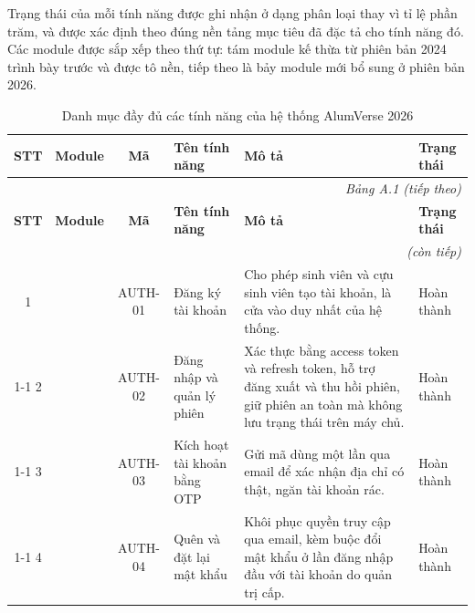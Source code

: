 \documentclass[12pt,a4paper,oneside]{report}
\begin{document}
Trạng thái của mỗi tính năng được ghi nhận ở dạng phân loại thay vì tỉ lệ phần trăm, và được xác định theo đúng nền tảng mục tiêu đã đặc tả cho tính năng đó. Các module được sắp xếp theo thứ tự: tám module kế thừa từ phiên bản 2024 trình bày trước và được tô nền, tiếp theo là bảy module mới bổ sung ở phiên bản 2026.

\renewcommand{\arraystretch}{1.3}
\footnotesize
\begin{longtable}{|c|>{\raggedright\arraybackslash}p{2.5cm}|c|>{\raggedright\arraybackslash}p{3.1cm}|>{\raggedright\arraybackslash}p{5.0cm}|>{\raggedright\arraybackslash}p{1.9cm}|}
\caption{Danh mục đầy đủ các tính năng của hệ thống AlumVerse 2026}\label{tab:appendixA}\\
\hline
\textbf{STT} & \textbf{Module} & \textbf{Mã} & \textbf{Tên tính năng} & \textbf{Mô tả} & \textbf{Trạng thái} \\ \hline
\endfirsthead
\multicolumn{6}{r}{\itshape\footnotesize Bảng A.1 (tiếp theo)}\\[2pt]
\hline
\textbf{STT} & \textbf{Module} & \textbf{Mã} & \textbf{Tên tính năng} & \textbf{Mô tả} & \textbf{Trạng thái} \\ \hline
\endhead
\hline \multicolumn{6}{r}{\itshape\footnotesize (còn tiếp)}\\
\endfoot
\hline
\endlastfoot
\cellcolor{oldrow}1 & \cellcolor{oldrow} & \cellcolor{oldrow}AUTH-01 & \cellcolor{oldrow}Đăng ký tài khoản & \cellcolor{oldrow}Cho phép sinh viên và cựu sinh viên tạo tài khoản, là cửa vào duy nhất của hệ thống. & \cellcolor{oldrow}Hoàn thành \\
\cline{1-1}\cline{3-6}
\cellcolor{oldrow}2 & \cellcolor{oldrow} & \cellcolor{oldrow}AUTH-02 & \cellcolor{oldrow}Đăng nhập và quản lý phiên & \cellcolor{oldrow}Xác thực bằng access token và refresh token, hỗ trợ đăng xuất và thu hồi phiên, giữ phiên an toàn mà không lưu trạng thái trên máy chủ. & \cellcolor{oldrow}Hoàn thành \\
\cline{1-1}\cline{3-6}
\cellcolor{oldrow}3 & \cellcolor{oldrow} & \cellcolor{oldrow}AUTH-03 & \cellcolor{oldrow}Kích hoạt tài khoản bằng OTP & \cellcolor{oldrow}Gửi mã dùng một lần qua email để xác nhận địa chỉ có thật, ngăn tài khoản rác. & \cellcolor{oldrow}Hoàn thành \\
\cline{1-1}\cline{3-6}
\cellcolor{oldrow}4 & \cellcolor{oldrow} & \cellcolor{oldrow}AUTH-04 & \cellcolor{oldrow}Quên và đặt lại mật khẩu & \cellcolor{oldrow}Khôi phục quyền truy cập qua email, kèm buộc đổi mật khẩu ở lần đăng nhập đầu với tài khoản do quản trị cấp. & \cellcolor{oldrow}Hoàn thành \\

\end{longtable}
\end{document}
